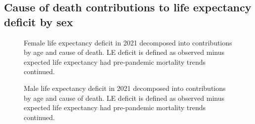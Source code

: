 \documentclass[12pt]{article}
\begin{document}
\clearpage

\subsection*{Cause of death contributions to life expectancy deficit by sex}

\begin{figure}[ht!]
    \centering
    \caption{Female life expectancy deficit in 2021 decomposed into contributions by age and cause of death. LE deficit is defined as observed minus expected life expectancy had pre-pandemic mortality trends continued.}
    \label{fig:figure-a6}
\end{figure}

\begin{figure}[ht!]
    \centering
    \caption{Male life expectancy deficit in 2021 decomposed into contributions by age and cause of death. LE deficit is defined as observed minus expected life expectancy had pre-pandemic mortality trends continued.}
    \label{fig:figure-a7}
\end{figure}
\end{document}
